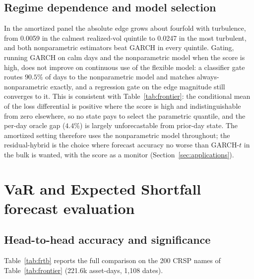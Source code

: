 \documentclass[11pt]{article}
\theoremstyle{remark}
\begin{document}
\subsection{Regime dependence and model selection}
\label{sec:gate}

In the amortized panel the absolute edge grows about fourfold with
turbulence, from 0.0059 in the calmest realized-vol quintile to 0.0247 in
the most turbulent, and both nonparametric estimators beat GARCH in every
quintile. Gating, running GARCH on calm days and the nonparametric model
when the score is high, does not improve on continuous use of the
flexible model: a classifier gate routes $90.5\%$ of days to the
nonparametric model and matches always-nonparametric exactly, and a
regression gate on the edge magnitude \citep{giacominiwhite2006} still
converges to it. This is consistent with Table~\ref{tab:frontier}: the
conditional mean of the loss differential is positive where the score is
high and indistinguishable from zero elsewhere, so no state pays to
select the parametric quantile, and the per-day oracle gap ($4.4\%$) is largely unforecastable from prior-day state. The amortized setting therefore uses the nonparametric
model throughout; the residual-hybrid is the choice where forecast accuracy no worse than GARCH-$t$ in the bulk is wanted, with the score as a monitor
(Section~\ref{sec:applications}).

\section{VaR and Expected Shortfall forecast evaluation}\label{sec:frtb}

\subsection{Head-to-head accuracy and significance}

Table~\ref{tab:frtb} reports the full comparison on the 200 CRSP names of Table~\ref{tab:frontier} (221.6k asset-days, 1{,}108 dates).
\end{document}
